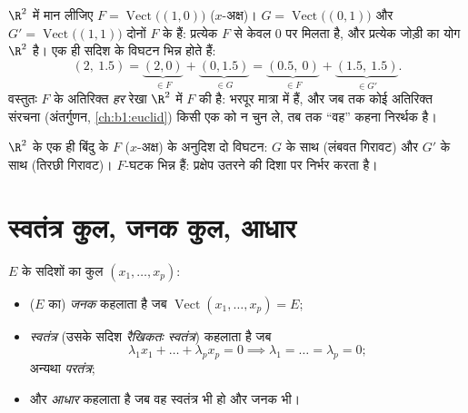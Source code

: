 \begin{example}[पूरक उपसमष्टि कभी अद्वितीय नहीं होती]
\label{ex:b1:vspaces:manysupplements}
$\R^2$ में मान लीजिए $F = \operatorname{Vect}\bigl((1,0)\bigr)$ ($x$-अक्ष)।
$G = \operatorname{Vect}\bigl((0,1)\bigr)$ और $G' =
\operatorname{Vect}\bigl((1,1)\bigr)$ दोनों $F$ के  हैं: प्रत्येक $F$ से
केवल $0$ पर मिलता है, और प्रत्येक जोड़ी का योग $\R^2$ है। एक ही सदिश के
विघटन भिन्न होते हैं:
\[
(2,\ 1.5) = \underbrace{(2, 0)}_{\in F} +
\underbrace{(0, 1.5)}_{\in G}
= \underbrace{(0.5,\ 0)}_{\in F} +
\underbrace{(1.5,\ 1.5)}_{\in G'} .
\]
वस्तुतः $F$ के अतिरिक्त \emph{हर} रेखा $\R^2$ में $F$ की  है:  भरपूर
मात्रा में हैं, और जब तक कोई अतिरिक्त संरचना (अंतर्गुणन,
\cref{ch:b1:euclid}) किसी एक को न चुन ले, तब तक ``वह''  कहना निरर्थक है।
\end{example}

\begin{omfigure}

{\small $\R^2$ के एक ही बिंदु के $F$ ($x$-अक्ष) के अनुदिश दो विघटन:  $G$
के साथ (लंबवत गिरावट) और  $G'$ के साथ (तिरछी गिरावट)। $F$-घटक भिन्न हैं:
प्रक्षेप उतरने की दिशा पर निर्भर करता है।}
\end{omfigure}

\section{स्वतंत्र कुल, जनक कुल, आधार}

\begin{definition}\label{def:b1:vspaces:free}
$E$ के सदिशों का कुल $(x_1, \dots, x_p)$:
\begin{itemize}
  \item ($E$ का) \emph{जनक} कहलाता है जब $\operatorname{Vect}(x_1,\dots,x_p)
  = E$;
  \item \emph{स्वतंत्र} (उसके सदिश \emph{रैखिकतः
  स्वतंत्र}) कहलाता है जब
        \[
        \lambda_1 x_1 + \dots + \lambda_p x_p = 0
        \implies \lambda_1 = \dots = \lambda_p = 0 ;
        \]
        अन्यथा \emph{परतंत्र};
  \item और \emph{आधार} कहलाता है जब वह स्वतंत्र भी हो और जनक भी।
\end{itemize}
\end{definition}

